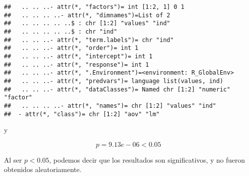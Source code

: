 \documentclass[]{article}
\begin{document}
\begin{verbatim}
##   .. .. ..- attr(*, "factors")= int [1:2, 1] 0 1
##   .. .. .. ..- attr(*, "dimnames")=List of 2
##   .. .. .. .. ..$ : chr [1:2] "values" "ind"
##   .. .. .. .. ..$ : chr "ind"
##   .. .. ..- attr(*, "term.labels")= chr "ind"
##   .. .. ..- attr(*, "order")= int 1
##   .. .. ..- attr(*, "intercept")= int 1
##   .. .. ..- attr(*, "response")= int 1
##   .. .. ..- attr(*, ".Environment")=<environment: R_GlobalEnv> 
##   .. .. ..- attr(*, "predvars")= language list(values, ind)
##   .. .. ..- attr(*, "dataClasses")= Named chr [1:2] "numeric" "factor"
##   .. .. .. ..- attr(*, "names")= chr [1:2] "values" "ind"
##  - attr(*, "class")= chr [1:2] "aov" "lm"
\end{verbatim}

y

\[p = 9.13e-06 < 0.05\]

Al ser \(p < 0.05\), podemos decir que los resultados son
significativos, y no fueron obtenidos aleatoriamente.
\end{document}

